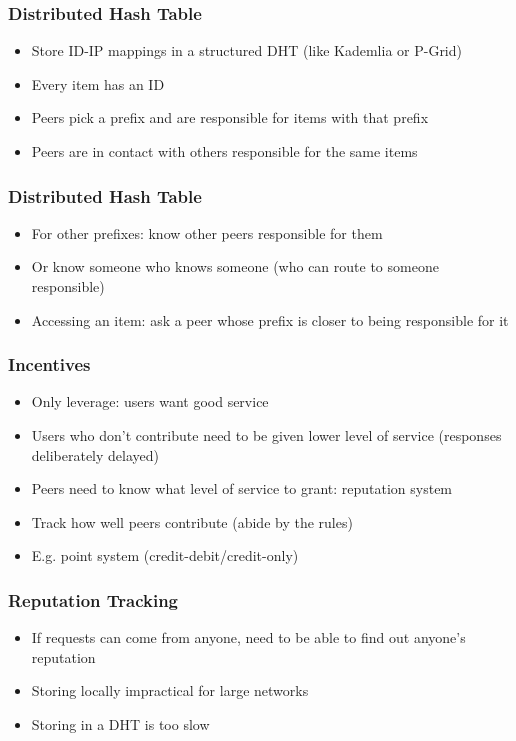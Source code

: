 \documentclass{beamer}
\begin{document}
\begin{frame}
  \frametitle{Distributed Hash Table}
  \begin{itemize}
    \item Store ID-IP mappings in a structured DHT (like Kademlia or P-Grid)
    \item Every item has an ID
    \item Peers pick a prefix and are responsible for items with that prefix
    \item Peers are in contact with others responsible for the same items
  \end{itemize}
\end{frame}

\begin{frame}
  \frametitle{Distributed Hash Table}
  \begin{itemize}
    \item For other prefixes: know other peers responsible for them
    \item Or know someone who knows someone (who can route to someone
          responsible)
    \item Accessing an item: ask a peer whose prefix is closer to being
          responsible for it
  \end{itemize}
\end{frame}

\begin{frame}
  \frametitle{Incentives}
  \begin{itemize}
    \item Only leverage: users want good service
    \item Users who don't contribute need to be given lower level of service
          (responses deliberately delayed)
    \item Peers need to know what level of service to grant: reputation system
    \item Track how well peers contribute (abide by the rules)
    \item E.g. point system (credit-debit/credit-only)
  \end{itemize}
\end{frame}

\begin{frame}
  \frametitle{Reputation Tracking}
  \begin{itemize}
    \item If requests can come from anyone, need to be able to find out anyone's
          reputation
    \item Storing locally impractical for large networks
    \item Storing in a DHT is too slow
  \end{itemize}
\end{frame}
\end{document}
